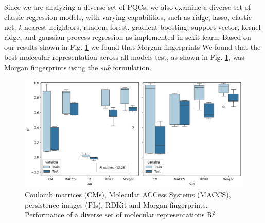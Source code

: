 \documentclass[journal=jacsat,manuscript=article]{achemso}
\begin{document}
Since we are analyzing a diverse set of PQCs, we also examine a diverse set of classic regression models, with varying capabilities, such as ridge, lasso, elastic net, \textit{k}-nearest-neighbors, random forest, gradient boosting, support vector, kernel ridge, and gaussian process regression as implemented in sckit-learn.\cite{pedregosa_scikit-learn_2011}
Based on our results shown in Fig. \ref{fig:classical_molrepfig} we found that Morgan fingerprints
We found that the best molecular representation across all models test, as shown in Fig. \ref{fig:classical_molrepfig}, was Morgan fingerprints using the \textit{sub} formulation.
 
\begin{figure}[H]
	\centering	
	\includegraphics[width=\linewidth]{../images/BSE/classical/classical_molrepfig.png}
	\caption{Coulomb matrices (CMs), Molecular ACCess Systems (MACCS), persistence images (PIs), RDKit and Morgan fingerprints. Performance of a diverse set of molecular representations R$^{2}$}
	\label{fig:classical_molrepfig}
\end{figure}
\end{document}
